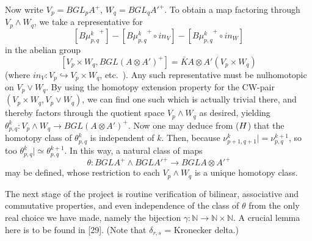 \documentclass[openany,leqno]{book}  %
\newcommand{\N}{\mathbb{N}}
\begin{document}
Now write $V_p = BGL_pA^+$, $W_q = BGL_q{A'}^+$. To obtain a map factoring through $V_p \wedge W_q$, we take a representative for
\[[{B\mu_{p,q}^k}^+]- [{B\mu_{p,q}^k}^+\circ in_V] - [{B\mu_{p,q}^k}^+\circ in_W]\]
in the abelian group
\[[V_p \times W_q, BGL(A \otimes A')^+] = \bar{K}A \otimes A'(V_p \times W_q)\]
(where $in_V\colon   V_p \hookrightarrow V_p \times W_q$, etc.\ ). Any such representative must be nulhomotopic on $V_p \vee W_q$. By using the homotopy extension property for the CW-pair $(V_p \times W_q, V_p \vee W_q)$, we can find one such which is actually trivial there, and thereby factors through the quotient space $V_p \wedge W_q$ as desired, yielding $\theta_{p,q}^k\colon  V_p \wedge W_q \longrightarrow BGL(A \otimes A')^+$. Now one may deduce from ($\ding{72}$) that the homotopy class of $\theta_{p,q}^k$ is independent of $k$. Then, because $\nu_{p+1,q+1}^{k}|= \nu_{p,q}^{k+1}$, so too
$\theta_{p,q}^k| \simeq \theta_{p,q}^{k+1}$. In this way, a natural class of maps
\[\theta \colon  BGLA^+ \wedge {BGLA'}^+ \longrightarrow {BGLA \otimes A'}^+\]
may be defined, whose restriction to each $V_p \wedge W_q$ is a unique homotopy class.

The next stage of the project is routine verification of bilinear, associative and commutative properties, and even independence of the class of $\theta$ from the only real choice we have made, namely the bijection $\gamma\colon  \N \longrightarrow \N \times \N$. A crucial lemma here is to be found in [29]. (Note that $\delta_{r,s}$ = Kronecker delta.)
\end{document}
